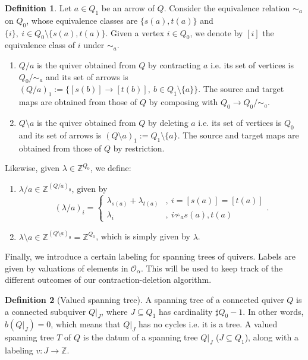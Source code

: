 \documentclass[11pt,english]{article}
\numberwithin{equation}{section}
\numberwithin{figure}{section}
\theoremstyle{definition}
\newtheorem{df}{Definition}[subsection]
\theoremstyle{plain}
\theoremstyle{remark}
\newcommand\ZZ{\mathbb{Z}}
\begin{document}
\begin{df}

Let $a\in Q_{1}$ be an arrow of $Q$. Consider the equivalence relation
$\sim_{a}$ on $Q_{0}$, whose equivalence classes are $\{s(a),t(a)\}$
and $\{i\},\ i\in Q_{0}\setminus\{s(a),t(a)\}$. Given a vertex $i\in Q_{0}$,
we denote by $[i]$ the equivalence class of $i$ under $\sim_{a}$.
\begin{enumerate}
\item $Q/a$ is the quiver obtained from $Q$ by contracting $a$ i.e. its
set of vertices is $Q_{0}/\sim_{a}$ and its set of arrows is $(Q/a)_{1}:=\{[s(b)]\rightarrow[t(b)],\ b\in Q_{1}\setminus\{a\}\}$.
The source and target maps are obtained from those of $Q$ by composing
with $Q_{0}\rightarrow Q_{0}/\sim_{a}$.
\item $Q\setminus a$ is the quiver obtained from $Q$ by deleting $a$
i.e. its set of vertices is $Q_{0}$ and its set of arrows is $(Q\setminus a)_{1}:=Q_{1}\setminus\{a\}$.
The source and target maps are obtained from those of $Q$ by restriction.
\end{enumerate}
Likewise, given $\lambda\in\ZZ^{Q_{0}}$, we define:
\begin{enumerate}
\item $\lambda/a\in\ZZ^{(Q/a)_{0}}$, given by \[
(\lambda/a)_i=
\left\{
\begin{array}{ll}
\lambda_{s(a)}+\lambda_{t(a)} & ,\ i=[s(a)]=[t(a)] \\
\lambda_i & ,\ i\not\sim_a s(a),t(a)
\end{array}
\right.
.
\]
\item $\lambda\setminus a\in\ZZ^{(Q\setminus a)_{0}}=\ZZ^{Q_{0}}$, which
is simply given by $\lambda$.
\end{enumerate}
\end{df}

Finally, we introduce a certain labeling for spanning trees of quivers.
Labels are given by valuations of elements in $\mathcal{O}_{\alpha}$.
This will be used to keep track of the different outcomes of our contraction-deletion
algorithm. 

\begin{df}[Valued spanning tree]

A spanning tree of a connected quiver $Q$ is a connected subquiver
$Q\vert_{J}$, where $J\subseteq Q_{1}$ has cardinality $\sharp Q_{0}-1$.
In other words, $b(Q\vert_{J})=0$, which means that $Q\vert_{J}$
has no cycles i.e. it is a tree. A valued spanning tree $T$ of $Q$
is the datum of a spanning tree $Q\vert_{J}$ ($J\subseteq Q_{1}$),
along with a labeling $v:J\rightarrow\mathbb{Z}$.

\end{df}
\end{document}
